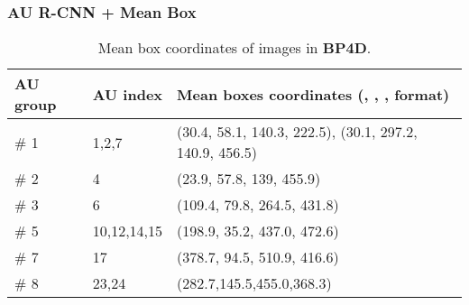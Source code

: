 \documentclass[5p,twocolumn]{elsarticle}
\begin{document}
\subsubsection{AU R-CNN + Mean Box}
\label{sec:mean_box}
\begin{table}[htp]
	\scriptsize	
	\setlength{\abovecaptionskip}{0pt} 
	\caption{Mean box coordinates of  images in \textbf{BP4D}.}
	\label{tab:BP4D_mean_box}
	\centering
	\tabcolsep=0.05cm
	\begin{tabular}{lll}
		\toprule
		
		AU group & AU index & Mean boxes coordinates (, , ,  format) \\
		\midrule
		\# 1 & 1,2,7 & (30.4, 58.1, 140.3, 222.5), (30.1, 297.2, 140.9, 456.5)  \\
		\# 2 & 4 & (23.9, 57.8, 139, 455.9) \\
		\# 3 & 6 & (109.4, 79.8, 264.5, 431.8) \\
		\# 5 & 10,12,14,15 & (198.9, 35.2, 437.0, 472.6) \\
		\# 7 & 17 & (378.7, 94.5, 510.9, 416.6) \\
		\# 8 & 23,24 & (282.7,145.5,455.0,368.3) \\
		\bottomrule
	\end{tabular}
	\vspace{-0.0cm}
\end{table}
\end{document}
